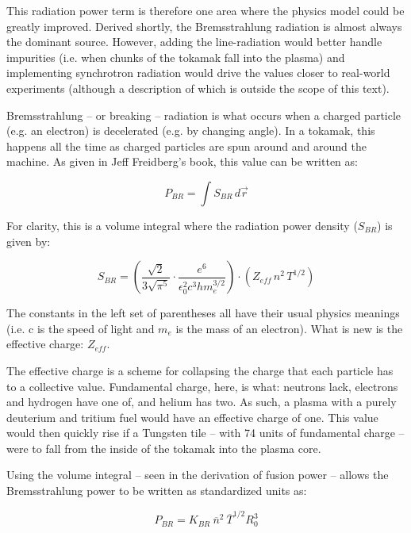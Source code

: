 This radiation power term is therefore one area where the physics model could be greatly improved. Derived shortly, the Bremsstrahlung radiation is almost always the dominant source. However, adding the line-radiation would better handle impurities (i.e. when chunks of the tokamak fall into the plasma) and implementing synchrotron radiation would drive the values closer to real-world experiments (although a description of which is outside the scope of this text).

Bremsstrahlung -- or breaking -- radiation is what occurs when a charged particle (e.g. an electron) is decelerated (e.g. by changing angle). In a tokamak, this happens all the time as charged particles are spun around and around the machine. As given in Jeff Freidberg's book, this value can be written as:

\begin{equation}
	P_{BR} = \int S_{BR} \, d \vec{r}
\end{equation}

For clarity, this is a volume integral where the radiation power density ($S_{BR}$) is given by:

\begin{equation}
	S_{BR} = \left( \frac{\sqrt{2}}{3 \sqrt{\pi^5}} \cdot \frac{e^6}{\epsilon_0^2 c^3 h m_e^{3/2}} \right) \cdot \left( Z_{eff} \, n^2 \, T^{1/2} \right)
\end{equation}

The constants in the left set of parentheses all have their usual physics meanings (i.e. c is the speed of light and $m_e$ is the mass of an electron). What is new is the effective charge: $Z_{eff}$.

The effective charge is a scheme for collapsing the charge that each particle has to a collective value. Fundamental charge, here, is what: neutrons lack, electrons and hydrogen have one of, and helium has two. As such, a plasma with a purely deuterium and tritium fuel would have an effective charge of one. This value would then quickly rise if a Tungsten tile -- with 74 units of fundamental charge -- were to fall from the inside of the tokamak into the plasma core.

Using the volume integral -- seen in the derivation of fusion power -- allows the Bremsstrahlung power to be written as standardized units as:

\begin{equation}
	\label{eq:pbr}
	P_{BR} = K_{BR} \ \overline n ^ 2 \ \overline T ^ {1/2} R_0^3 
\end{equation}

